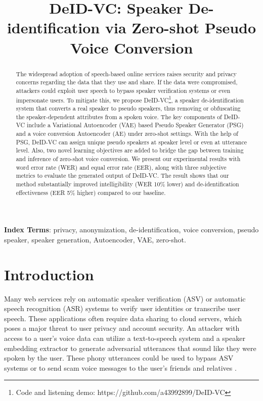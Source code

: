 \documentclass[a4paper]{article}
\title{DeID-VC: Speaker De-identification via Zero-shot Pseudo Voice Conversion}
\begin{document}
\maketitle
%
\begin{abstract} %
The widespread adoption of speech-based online services raises security and privacy concerns regarding the data that they use and share. If the data were compromised, attackers could exploit user speech to bypass speaker verification systems or even impersonate users. To mitigate this, we propose DeID-VC\footnote{Code and listening demo: https://github.com/a43992899/DeID-VC}, a speaker de-identification system that converts a real speaker to pseudo speakers, thus removing or obfuscating the speaker-dependent attributes from a spoken voice. The key components of DeID-VC include a Variational Autoencoder (VAE) based Pseudo Speaker Generator (PSG) and a voice conversion Autoencoder (AE) under zero-shot settings. With the help of PSG, DeID-VC can assign unique pseudo speakers at speaker level or even at utterance level. Also, two novel learning objectives are added to bridge the gap between training and inference of zero-shot voice conversion. We present our experimental results with word error rate (WER) and equal error rate (EER), along with three subjective metrics to evaluate the generated output of DeID-VC. The result shows that our method substantially improved intelligibility (WER 10\% lower) and de-identification effectiveness (EER 5\% higher) compared to our baseline.

\end{abstract}
\noindent\textbf{Index Terms}: privacy, anonymization, de-identification, voice conversion, pseudo speaker, speaker generation, Autoencoder, VAE, zero-shot.

\section{Introduction}
Many web services rely on automatic speaker verification (ASV) or automatic speech recognition (ASR) systems to verify user identities or transcribe user speech. These applications often require data sharing to cloud servers, which poses a major threat to user privacy and account security. An attacker with access to a user's voice data can utilize a text-to-speech system and a speaker embedding extractor to generate adversarial utterances that sound like they were spoken by the user. These phony utterances could be used to bypass ASV systems or to send scam voice messages to the user's friends and relatives \cite{kinnunen2012vulnerability}.
\end{document}

